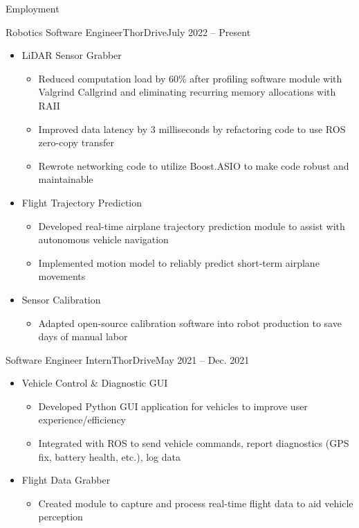\documentclass[calibri]{my-resume}
\begin{document}
	\makeheader

	\begin{cvsection}{Employment}
		\begin{cvsubsection}{Robotics Software Engineer}{ThorDrive}{July 2022 -- Present}
			\begin{itemize}
				\item LiDAR Sensor Grabber
				\begin{itemize}
					\item Reduced computation load by 60\% after profiling software module with Valgrind Callgrind and eliminating recurring memory allocations with RAII
					\item Improved data latency by 3 milliseconds by refactoring code to use ROS zero-copy transfer
					\item Rewrote networking code to utilize Boost.ASIO to make code robust and maintainable
				\end{itemize}
				\item Flight Trajectory Prediction
				\begin{itemize}
					\item Developed real-time airplane trajectory prediction module to assist with autonomous vehicle navigation
					\item Implemented motion model to reliably predict short-term airplane movements
				\end{itemize}
				\item Sensor Calibration
				\begin{itemize}
					\item Adapted open-source calibration software into robot production to save days of manual labor
				\end{itemize}
			\end{itemize}
		\end{cvsubsection}

		\begin{cvsubsection}{Software Engineer Intern}{ThorDrive}{May 2021 -- Dec. 2021}
			\begin{itemize}
				\item Vehicle Control \& Diagnostic GUI
				\begin{itemize}
					\item Developed Python GUI application for vehicles to improve user experience/efficiency
					\item Integrated with ROS to send vehicle commands, report diagnostics (GPS fix, battery health, etc.), log data
				\end{itemize}
				\item Flight Data Grabber
				\begin{itemize}
					\item Created module to capture and process real-time flight data to aid vehicle perception
				\end{itemize}
			\end{itemize}
		\end{cvsubsection}


\end{cvsection}
\end{document}
